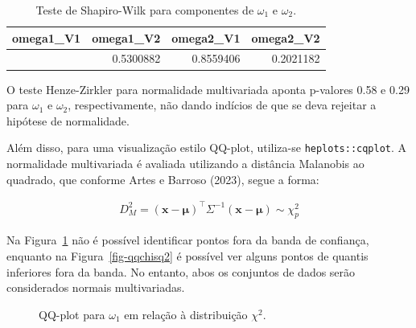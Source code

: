 \documentclass[
  a4paperpaper,
]{article}
\begin{document}
\begin{longtable}[]{@{}rrrr@{}}

\caption{\label{tbl-testshapiro}Teste de Shapiro-Wilk para componentes
de \(\omega_1\) e \(\omega_2\).}

\tabularnewline

\toprule\noalign{}
omega1\_V1 & omega1\_V2 & omega2\_V1 & omega2\_V2 \\
\midrule\noalign{}
\endhead
\bottomrule\noalign{}
\endlastfoot
0.5506312 & 0.5300882 & 0.8559406 & 0.2021182 \\

\end{longtable}

O teste Henze-Zirkler para normalidade multivariada aponta p-valores
0.58 e 0.29 para \(\omega_1\) e \(\omega_2\), respectivamente, não dando
indícios de que se deva rejeitar a hipótese de normalidade.

Além disso, para uma visualização estilo QQ-plot, utiliza-se
\texttt{heplots::cqplot}. A normalidade multivariada é avaliada
utilizando a distância Malanobis ao quadrado, que conforme Artes e
Barroso (2023), segue a forma:

\begin{align}
  D^2_M = (\boldsymbol{x} - \boldsymbol{\mu})^\top \Sigma^{-1} (\boldsymbol{x} - \boldsymbol{\mu}) \sim \chi^2_p
\end{align}

Na Figura~\ref{fig-qqchisq1} não é possível identificar pontos fora da
banda de confiança, enquanto na Figura~\ref{fig-qqchisq2} é possível ver
alguns pontos de quantis inferiores fora da banda. No entanto, abos os
conjuntos de dados serão considerados normais multivariadas.

\begin{figure}[H]


\caption{\label{fig-qqchisq1}QQ-plot para \(\omega_1\) em relação à
distribuição \(\chi^2\).}

\end{figure}%
\end{document}
